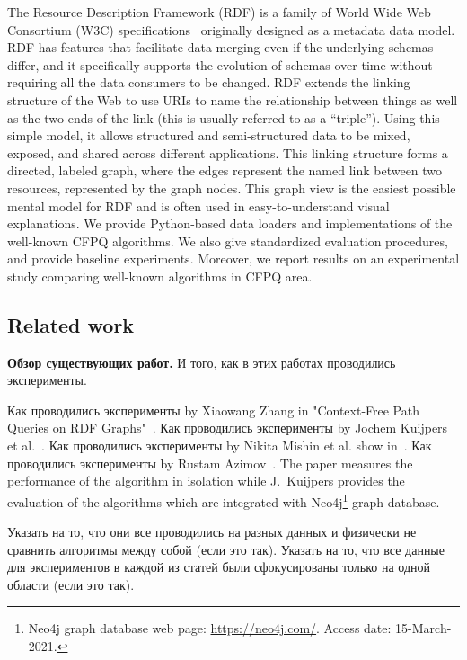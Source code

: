 The Resource Description Framework (RDF) is a family of World Wide Web Consortium (W3C) specifications~\cite{semanticweb} originally designed as a metadata data model.
RDF has features that facilitate data merging even if the underlying schemas differ, and it specifically supports the evolution of schemas over time without requiring all the data consumers to be changed. 
RDF extends the linking structure of the Web to use URIs to name the relationship between things as well as the two ends of the link (this is usually referred to as a “triple”). 
Using this simple model, it allows structured and semi-structured data to be mixed, exposed, and shared across different applications. 
This linking structure forms a directed, labeled graph, where the edges represent the named link between two resources, represented by the graph nodes. 
This graph view is the easiest possible mental model for RDF and is often used in easy-to-understand visual explanations.
We provide Python-based data loaders and implementations of the well-known CFPQ algorithms.
We also give standardized evaluation procedures, and provide baseline experiments.
Moreover, we report results on an experimental study comparing well-known algorithms in CFPQ area.

\subsection{Related work}
\textbf{Обзор существующих работ.} И того, как в этих работах проводились эксперименты.

Как проводились эксперименты by Xiaowang Zhang in "Context-Free Path Queries on RDF Graphs"~\cite{RDF}.
Как проводились эксперименты by Jochem Kuijpers et al.~\cite{Kuijpers:2019:ESC:3335783.3335791}.
Как проводились эксперименты by Nikita Mishin et al. show in~\cite{Mishin:2019:ECP:3327964.3328503}.
Как проводились эксперименты by Rustam Azimov~\cite{Azimov:2018:CPQ:3210259.3210264}. The paper measures the performance of the algorithm in isolation while J.~Kuijpers provides the evaluation of the algorithms which are integrated with Neo4j\footnote{Neo4j graph database web page: \url{https://neo4j.com/}. Access date: 15-March-2021.} graph database.

Указать на то, что они все проводились на разных данных и физически не сравнить алгоритмы между собой (если это так).
Указать на то, что все данные для экспериментов в каждой из статей были сфокусированы только на одной области (если это так).
